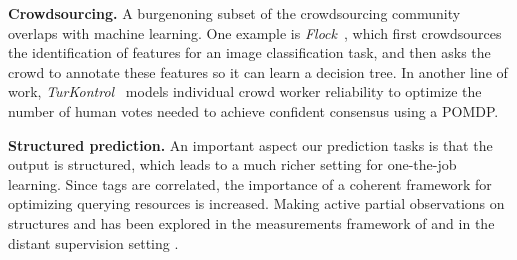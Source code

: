 \textbf{Crowdsourcing.}
A burgenoning subset of the crowdsourcing community overlaps with
machine learning. %
One example is \textit{Flock}~\cite{cheng2015flock}, which first crowdsources the identification of
features for an image classification task, and then asks the crowd to annotate
these features so it can learn a decision tree.
In another line of work, \textit{TurKontrol}~\cite{dai2010decision} models
individual crowd worker reliability to optimize the number of human votes
needed to achieve confident consensus using a POMDP\@.

\textbf{Structured prediction.}
An important aspect our prediction tasks is that the output is structured,
which leads to a much richer setting for one-the-job learning.
Since tags are correlated, the importance of a coherent framework for optimizing
querying resources is increased.
Making active partial observations on structures
and has been explored in the measurements framework of \citet{liang09measurements}
and in the distant supervision setting \citet{angeli2014combining}.




